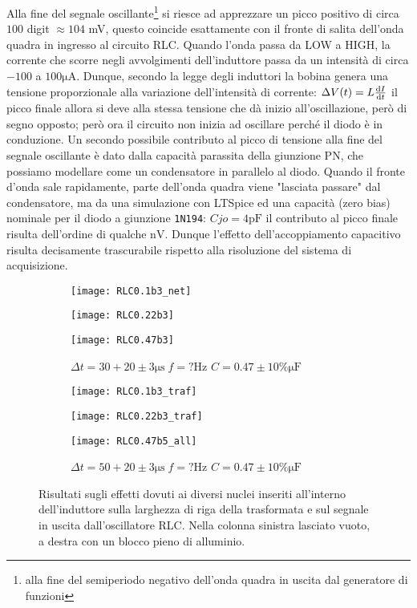 \documentclass{article}[a4paper, oneside, 11pt]
\begin{document}
Alla fine del segnale oscillante\footnote{alla fine del
semiperiodo negativo dell'onda quadra in uscita dal generatore di funzioni}
si riesce ad apprezzare un picco positivo di circa $100$ digit $\approx 104$ mV,
questo coincide esattamente con il fronte di salita dell'onda quadra in
ingresso al circuito RLC.
Quando l'onda passa da LOW a HIGH, la corrente che scorre negli avvolgimenti
dell'induttore passa da un intensità di circa $-100$ a $100 \si{\micro\A}$.
Dunque, secondo la legge degli induttori la bobina genera una tensione
proporzionale alla variazione dell'intensità di corrente:
$\Delta V(t) = L \frac{\mathrm{d} I}{\mathrm{d} t}$
il picco finale allora si deve alla stessa tensione che dà inizio
all'oscillazione, però di segno opposto; però ora il circuito non inizia
ad oscillare perché il diodo è in conduzione.
Un secondo possibile contributo al picco di tensione alla
fine del segnale oscillante è dato dalla capacità parassita
della giunzione PN, che possiamo  modellare come un condensatore
in parallelo al diodo. Quando il fronte d'onda sale rapidamente, parte
dell'onda quadra viene "lasciata passare" dal condensatore, ma da 
una simulazione con LTSpice ed una capacità (zero bias) nominale per
il diodo a giunzione \texttt{1N194}: $Cjo = 4 \si{\pico\farad}$
il contributo al picco finale risulta dell'ordine di qualche $\si{\nano\V}$.
Dunque l'effetto dell'accoppiamento capacitivo risulta decisamente trascurabile
rispetto alla risoluzione del sistema di acquisizione.
\begin{figure}[!htb]
\centering
	\begin{subfigure}{.5\textwidth}
		\texttt{[image: RLC0.1b3\_net]} 
	\caption{$\Delta t = 30 + 20 \pm 3 \si{\us} \; f = 680 \si{\Hz}$
		$C = 0.1 \pm 10 \% \si{\micro\F}$}
		\texttt{[image: RLC0.22b3]} 
	\caption{$\Delta t = 30 + 20 \pm 3 \si{\us} \; f = ? \si{\Hz}$
			$C = 0.22 \pm 10 \% \si{\micro\F}$}
		\texttt{[image: RLC0.47b3]} 
	\caption{$\Delta t = 30 + 20 \pm 3 \si{\us} \; f = ? \si{\Hz}$
			$C = 0.47 \pm 10 \% \si{\micro\F}$}
	\end{subfigure}%
	\begin{subfigure}{.5\textwidth}
		\texttt{[image: RLC0.1b3\_traf]}
	\caption{$\Delta t = 30 + 20 \pm 3 \si{\us} \; f = ? \si{\Hz}$
			$C = 0.1 \pm 10 \% \si{\micro\F}$}
		\texttt{[image: RLC0.22b3\_traf]}
	\caption{$\Delta t = 30 + 20 \pm 3 \si{\us} \; f = ? \si{\Hz}$
			$C = 0.22 \pm 10\% \si{\micro\F}$}
		\texttt{[image: RLC0.47b5\_all]}
	\caption{$\Delta t = 50 + 20 \pm 3 \si{\us} \; f = ? \si{\Hz}$
			$C = 0.47 \pm 10 \% \si{\micro\F}$}
	\end{subfigure}%
	\caption{Risultati sugli effetti dovuti ai diversi nuclei inseriti
			all'interno dell'induttore sulla larghezza di riga della trasformata
			e sul segnale in uscita dall'oscillatore RLC. Nella colonna sinistra
			lasciato vuoto, a destra con un blocco pieno di alluminio.
			 \label{fig: RLCall}}
\end{figure}
\end{document}
